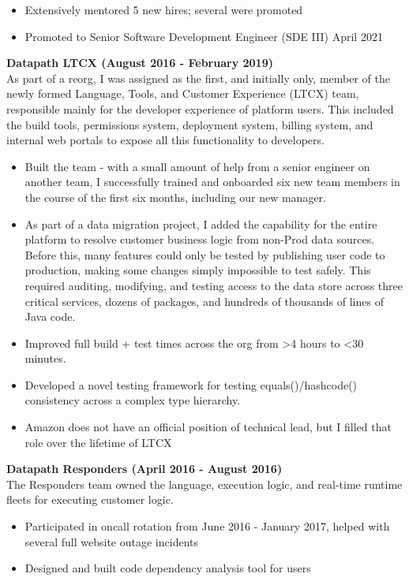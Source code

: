 \documentclass{res}
\begin{document}
\begin{resume}
\begin{itemize}
   \item Extensively mentored 5 new hires; several were promoted
   \item Promoted to Senior Software Development Engineer (SDE III) April 2021
   \end{itemize}
   {\bf Datapath LTCX (August 2016 - February 2019) }\\
   As part of a reorg, I was assigned as the first, and initially only, member of the newly formed Language, Tools, and Customer Experience (LTCX) team, responsible mainly for the developer experience of platform users.  This included the build tools, permissions system, deployment system, billing system, and internal web portals to expose all this functionality to developers.
   \begin{itemize}
   \item Built the team - with a small amount of help from a senior engineer on another team, I successfully trained and onboarded six new team members in the course of the first six months, including our new manager.
   \item As part of a data migration project, I added the capability for the entire platform to resolve customer business logic from non-Prod data sources.  Before this, many features could only be tested by publishing user code to production, making some changes simply impossible to test safely.  This required auditing, modifying, and testing access to the data store across three critical services, dozens of packages, and hundreds of thousands of lines of Java code.
   \item Improved full build + test times across the org from >4 hours to <30 minutes.
   \item Developed a novel testing framework for testing equals()/hashcode() consistency across a complex type hierarchy.
   \item Amazon does not have an official position of technical lead, but I filled that role over the lifetime of LTCX
   \end{itemize}
   {\bf Datapath Responders (April 2016 - August 2016) }\\
   The Responders team owned the language, execution logic, and real-time runtime fleets for executing customer logic.
   \begin{itemize}
   \item Participated in oncall rotation from June 2016 - January 2017, helped with several full website outage incidents
   \item Designed and built code dependency analysis tool for users

\end{itemize}
\end{resume}
\end{document}

